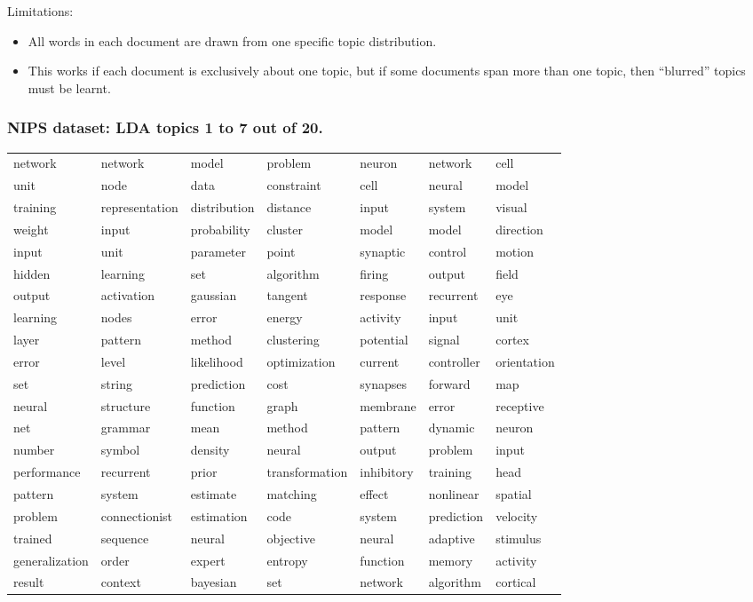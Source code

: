 \begin{frame}
Limitations:
\begin{itemize}
\item All words in each document are drawn from one specific topic distribution.
\item This works if each document is exclusively about one topic, but if 
some documents span more than one topic, then ``blurred'' topics must be
learnt.
\end{itemize}

\end{frame}


\begin{frame}
\frametitle{NIPS dataset: LDA topics 1 to 7 out of 20.}

{\scriptsize
\begin{tabular}{l l l l l l l} 
network & network & model & problem & neuron & network & cell\\ 
unit & node & data & constraint & cell & neural & model\\ 
training & representation & distribution & distance & input & system & visual\\ 
weight & input & probability & cluster & model & model & direction\\ 
input & unit & parameter & point & synaptic & control & motion\\ 
hidden & learning & set & algorithm & firing & output & field\\ 
output & activation & gaussian & tangent & response & recurrent & eye\\ 
learning & nodes & error & energy & activity & input & unit\\ 
layer & pattern & method & clustering & potential & signal & cortex\\ 
error & level & likelihood & optimization & current & controller & orientation\\ 
set & string & prediction & cost & synapses & forward & map\\ 
neural & structure & function & graph & membrane & error & receptive\\ 
net & grammar & mean & method & pattern & dynamic & neuron\\ 
number & symbol & density & neural & output & problem & input\\ 
performance & recurrent & prior & transformation & inhibitory & training & head\\ 
pattern & system & estimate & matching & effect & nonlinear & spatial\\ 
problem & connectionist & estimation & code & system & prediction & velocity\\ 
trained & sequence & neural & objective & neural & adaptive & stimulus\\ 
generalization & order & expert & entropy & function & memory & activity\\ 
result & context & bayesian & set & network & algorithm & cortical
\end{tabular}
}
\end{frame}


